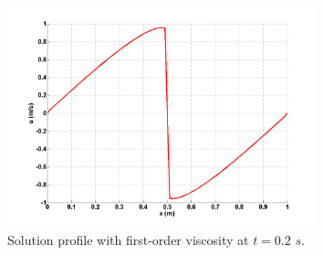 \begin{figure}[H]
        \centering
        \includegraphics[width=0.8\textwidth]{figures/1D_sol_fo.png}
        \caption{Solution profile with first-order viscosity at $t=0.2$ $s$.}
        \label{fig:1d_burger_fo}
\end{figure}
        

